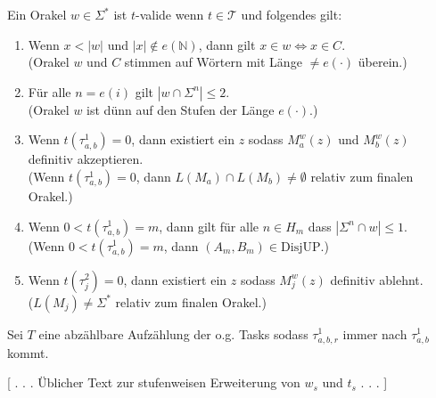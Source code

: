 \documentclass[nofonts]{uebung}
\def\DisjUP{\ensuremath{\mathrm{DisjUP}}}
\begin{document}
Ein Orakel $w\in\Sigma^*$ ist $t$-valide wenn $t\in\mathcal T$ und folgendes gilt:
\begin{enumerate}[label={V\arabic*}]
    \item Wenn $x<|w|$ und $|x|\not\in e(\mathbb N)$, dann gilt $x\in w\iff x\in C$.\\
        (Orakel $w$ und $C$ stimmen auf Wörtern mit Länge $\neq e(\cdot)$ überein.)
    \item Für alle $n=e(i)$ gilt $|w\cap \Sigma^n|\leq 2$.\\
        (Orakel $w$ ist dünn auf den Stufen der Länge $e(\cdot)$.)
    \item Wenn $t(\tau^1_{a,b})=0$, dann existiert ein $z$ sodass $M_a^w(z)$ und $M_b^w(z)$ definitiv akzeptieren.\\
        (Wenn $t(\tau^1_{a,b})=0$, dann $L(M_a)\cap L(M_b)\neq \emptyset$ relativ zum finalen Orakel.)
    \item Wenn $0<t(\tau^1_{a,b})=m$, dann gilt für alle $n\in H_m$ dass $|\Sigma^n\cap w|\leq 1$.\\
        (Wenn $0<t(\tau^1_{a,b})=m$, dann $(A_m,B_m)\in\DisjUP$.)
    \item Wenn $t(\tau^2_j)=0$, dann existiert ein $z$ sodass $M_j^w(z)$ definitiv ablehnt.\\
        ($L(M_j)\neq \Sigma^*$ relativ zum finalen Orakel.)
\end{enumerate}

Sei $T$ eine abzählbare Aufzählung der o.g. Tasks sodass $\tau^1_{a,b,r}$ immer nach $\tau^1_{a,b}$ kommt.

[ . . . Üblicher Text zur stufenweisen Erweiterung von $w_s$ und $t_s$ . . . ]
\end{document}
